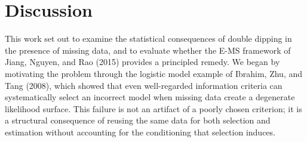 \documentclass[
  12pt,
]{article}
\begin{document}

\section{Discussion}


This work set out to examine the statistical consequences of double dipping 
in the presence of missing data, and to evaluate whether the E-MS framework 
of Jiang, Nguyen, and Rao (2015) provides a principled remedy. We began by 
motivating the problem through the logistic model example of Ibrahim, Zhu, 
and Tang (2008), which showed that even well-regarded information criteria 
can systematically select an incorrect model when missing data create a 
degenerate likelihood surface. This failure is not an artifact of a poorly 
chosen criterion; it is a structural consequence of reusing the same data 
for both selection and estimation without accounting for the conditioning 
that selection induces.
\end{document}
